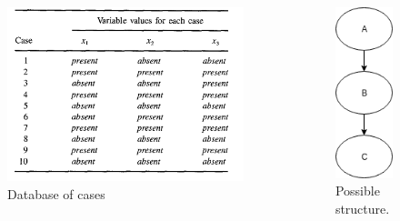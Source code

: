 \begin{frame}


        \begin{columns}
	    \centering
        \begin{figure}[!h]
            \centering
            \includegraphics[scale=0.45]{figuras/cases_cooper.png}
            \caption{Database of cases}
            \label{fig:casesCoop}
        \end{figure}
        \centering
        \begin{figure}[!h]
            \centering
            \includegraphics[scale=0.45]{figuras/typicOrder.png}
            \caption{Possible structure.}
            \label{fig:cases_graph}
        \end{figure}
	      
    \end{columns}
\end{frame}
    
